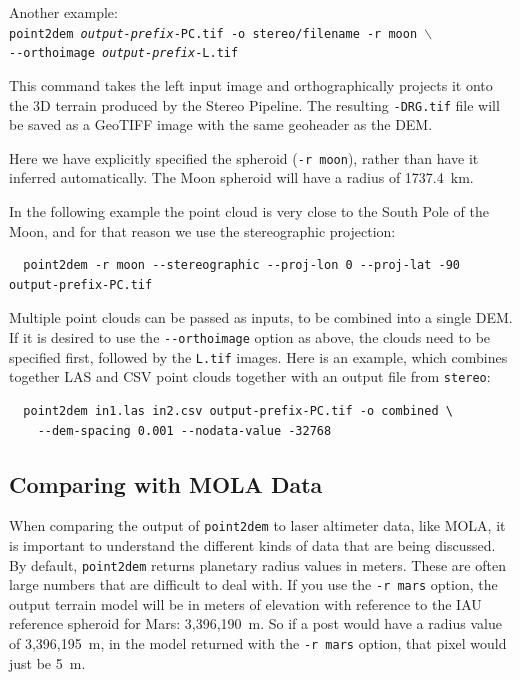 Another example: \\
\hspace*{2em}\texttt{point2dem \textit{output-prefix}-PC.tif -o stereo/filename -r moon $\backslash$} \\
\hspace*{4em}\texttt{-\/-orthoimage \textit{output-prefix}-L.tif}

This command takes the left input image and orthographically projects
it onto the 3D terrain produced by the Stereo Pipeline.  The resulting
{\tt *-DRG.tif} file will be saved as a GeoTIFF image with the same
geoheader as the DEM.

Here we have explicitly specified the spheroid (\texttt{-r moon}), rather
than have it inferred automatically. The Moon spheroid will have
a radius of 1737.4~km.

In the following example the point cloud is very close to the
South Pole of the Moon, and for that reason we use the stereographic projection:
\begin{verbatim}
  point2dem -r moon --stereographic --proj-lon 0 --proj-lat -90 output-prefix-PC.tif
\end{verbatim}

Multiple point clouds can be passed as inputs, to be combined into a
single \ac{DEM}. If it is desired to use the \texttt{-\/-orthoimage}
option as above, the clouds need to be specified first, followed by the
\texttt{L.tif} images. Here is an example, which combines together LAS
and CSV point clouds together with an output file from {\tt stereo}:
\begin{verbatim}
  point2dem in1.las in2.csv output-prefix-PC.tif -o combined \
    --dem-spacing 0.001 --nodata-value -32768
\end{verbatim}

\subsection{Comparing with MOLA Data}
\label{molacmp}

When comparing the output of \texttt{point2dem} to laser altimeter
data, like MOLA, it is important to understand the different kinds
of data that are being discussed.  By default, \texttt{point2dem}
returns planetary radius values in meters.  These are often large
numbers that are difficult to deal with.  If you use the \texttt{-r
mars} option, the output terrain model will be in meters of elevation
with reference to the IAU reference spheroid for Mars: 3,396,190~m.
So if a post would have a radius value of 3,396,195~m, in the model
returned with the \texttt{-r mars} option, that pixel would just be 5~m.


